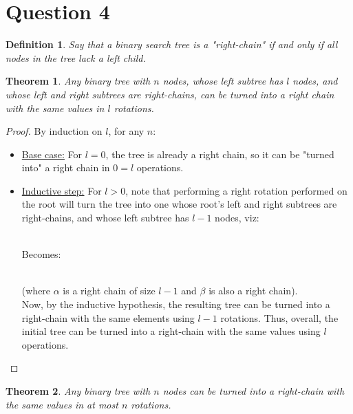 \documentclass[a4paper,11pt]{scrartcl}
\newtheorem{theorem}{Theorem}
\newtheorem{definition}{Definition}
\begin{document}
\section*{Question 4}
\begin{definition}
    Say that a binary search tree is a "right-chain" if and only if all nodes in the tree lack a left child.
\end{definition}
\begin{theorem}
    Any binary tree with $n$ nodes, whose left subtree has $l$ nodes, and whose left and right subtrees are right-chains, can be turned into a right chain with the same values in $l$ rotations.
\end{theorem}
\begin{proof}
    By induction on $l$, for any $n$:
    \begin{itemize}
        \item \underline{Base case:} For $l = 0$, the tree is already a right chain, so it can be "turned into" a right chain in $0 = l$ operations.
        \item \underline{Inductive step:} For $l > 0$, note that performing a right rotation performed on the root will turn the tree into one whose root's left and right subtrees are right-chains, and whose left subtree has $l-1$ nodes, viz: \\

  \\
            Becomes: \\
  \\
            (where $\alpha$ is a right chain of size $l-1$ and $\beta$ is also a right chain). \\
            Now, by the inductive hypothesis, the resulting tree can be turned into a right-chain with the same elements using $l-1$ rotations. Thus, overall, the initial tree can be turned into a right-chain with the same values using $l$ operations.
    \end{itemize}
\end{proof}
\begin{theorem}
    Any binary tree with $n$ nodes can be turned into a right-chain with the same values in at most $n$ rotations.
\end{theorem}
\end{document}
